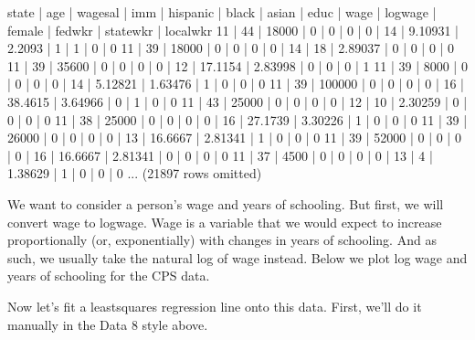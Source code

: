 \documentclass[letterpaper,10pt,english]{jupyterBook}
\begin{document}
\begin{sphinxVerbatim}[commandchars=\\\{\}]
state | age  | wagesal | imm  | hispanic | black | asian | educ | wage    | logwage | female | fedwkr | statewkr | localwkr
11    | 44   | 18000   | 0    | 0        | 0     | 0     | 14   | 9.10931 | 2.2093  | 1      | 1      | 0        | 0
11    | 39   | 18000   | 0    | 0        | 0     | 0     | 14   | 18      | 2.89037 | 0      | 0      | 0        | 0
11    | 39   | 35600   | 0    | 0        | 0     | 0     | 12   | 17.1154 | 2.83998 | 0      | 0      | 0        | 1
11    | 39   | 8000    | 0    | 0        | 0     | 0     | 14   | 5.12821 | 1.63476 | 1      | 0      | 0        | 0
11    | 39   | 100000  | 0    | 0        | 0     | 0     | 16   | 38.4615 | 3.64966 | 0      | 1      | 0        | 0
11    | 43   | 25000   | 0    | 0        | 0     | 0     | 12   | 10      | 2.30259 | 0      | 0      | 0        | 0
11    | 38   | 25000   | 0    | 0        | 0     | 0     | 16   | 27.1739 | 3.30226 | 1      | 0      | 0        | 0
11    | 39   | 26000   | 0    | 0        | 0     | 0     | 13   | 16.6667 | 2.81341 | 1      | 0      | 0        | 0
11    | 39   | 52000   | 0    | 0        | 0     | 0     | 16   | 16.6667 | 2.81341 | 0      | 0      | 0        | 0
11    | 37   | 4500    | 0    | 0        | 0     | 0     | 13   | 4       | 1.38629 | 1      | 0      | 0        | 0
... (21897 rows omitted)
\end{sphinxVerbatim}

\sphinxAtStartPar
We want to consider a person’s wage and years of schooling. But first, we will convert wage to log\sphinxhyphen{}wage. Wage is a variable that we would expect to increase proportionally (or, exponentially) with changes in years of schooling. And as such, we usually take the natural log of wage instead. Below we plot log wage and years of schooling for the CPS data.

\noindent{}

\sphinxAtStartPar
Now let’s fit a least\sphinxhyphen{}squares regression line onto this data. First, we’ll do it manually in the Data 8 style above.

\begin{sphinxVerbatim}[commandchars=\\\{\}]
  
  

   
      
      
\end{sphinxVerbatim}
\end{document}
